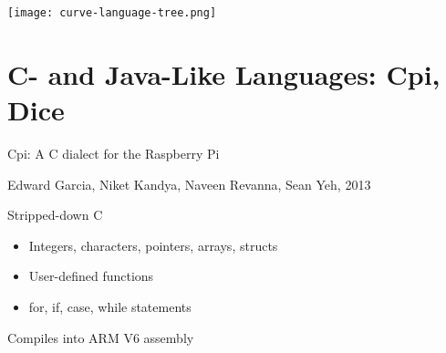 \documentclass{plt}
\begin{document}
\begin{frame}
\texttt{[image: curve-language-tree.png]}
\end{frame}

\section{C- and Java-Like Languages: Cpi, Dice}

\begin{frame}{Cpi: A C dialect for the Raspberry Pi}

{\small Edward Garcia, Niket Kandya,  
 Naveen Revanna, Sean Yeh, 2013}

Stripped-down C

\begin{itemize}
\item Integers, characters, pointers, arrays, structs
\item User-defined functions
\item for, if, case, while statements
\end{itemize}

Compiles into ARM V6 assembly

\end{frame}
\end{document}
